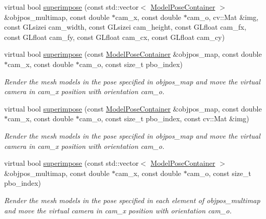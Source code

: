 \begin{DoxyCompactItemize}
\item 
virtual bool \mbox{\hyperlink{classSICAD_a269e238387393b44177daa4eae88fedd}{superimpose}} (const std\+::vector$<$ \mbox{\hyperlink{classSuperimpose_a178e3d4e2def6635bfcf9454dd4b5d22}{Model\+Pose\+Container}} $>$ \&objpos\+\_\+multimap, const double $\ast$cam\+\_\+x, const double $\ast$cam\+\_\+o, cv\+::\+Mat \&img, const G\+Lsizei cam\+\_\+width, const G\+Lsizei cam\+\_\+height, const G\+Lfloat cam\+\_\+fx, const G\+Lfloat cam\+\_\+fy, const G\+Lfloat cam\+\_\+cx, const G\+Lfloat cam\+\_\+cy)
\item 
virtual bool \mbox{\hyperlink{classSICAD_a5a76058edfdeed2b37b40bde2eec3db1}{superimpose}} (const \mbox{\hyperlink{classSuperimpose_a178e3d4e2def6635bfcf9454dd4b5d22}{Model\+Pose\+Container}} \&objpos\+\_\+map, const double $\ast$cam\+\_\+x, const double $\ast$cam\+\_\+o, const size\+\_\+t pbo\+\_\+index)
\begin{DoxyCompactList}\small\item\em Render the mesh models in the pose specified in {\ttfamily objpos\+\_\+map} and move the virtual camera in {\ttfamily cam\+\_\+x} position with orientation {\ttfamily cam\+\_\+o}. \end{DoxyCompactList}\item 
virtual bool \mbox{\hyperlink{classSICAD_a0dfbfdd508faf5f07a58ddfb6b9da50b}{superimpose}} (const \mbox{\hyperlink{classSuperimpose_a178e3d4e2def6635bfcf9454dd4b5d22}{Model\+Pose\+Container}} \&objpos\+\_\+map, const double $\ast$cam\+\_\+x, const double $\ast$cam\+\_\+o, const size\+\_\+t pbo\+\_\+index, const cv\+::\+Mat \&img)
\begin{DoxyCompactList}\small\item\em Render the mesh models in the pose specified in {\ttfamily objpos\+\_\+map} and move the virtual camera in {\ttfamily cam\+\_\+x} position with orientation {\ttfamily cam\+\_\+o}. \end{DoxyCompactList}\item 
virtual bool \mbox{\hyperlink{classSICAD_acf0ea95ecb121c0b265ca52ac589d80f}{superimpose}} (const std\+::vector$<$ \mbox{\hyperlink{classSuperimpose_a178e3d4e2def6635bfcf9454dd4b5d22}{Model\+Pose\+Container}} $>$ \&objpos\+\_\+multimap, const double $\ast$cam\+\_\+x, const double $\ast$cam\+\_\+o, const size\+\_\+t pbo\+\_\+index)
\begin{DoxyCompactList}\small\item\em Render the mesh models in the pose specified in each element of {\ttfamily objpos\+\_\+multimap} and move the virtual camera in {\ttfamily cam\+\_\+x} position with orientation {\ttfamily cam\+\_\+o}. \end{DoxyCompactList}\item 

\end{DoxyCompactItemize}
